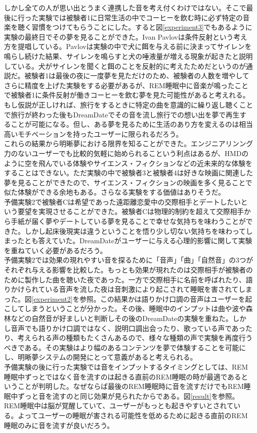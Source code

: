 しかし全ての人が思い出とうまく連携した音を考え付くわけではない。そこで最後に行った実験では被験者1に日常生活の中でコーヒーを飲む時に必ず特定の音楽を聴く習慣をつけてもらうことにした。すると図\ref{experiment3}でもあるように実験の最終日でその夢を見ることができた。Ivan Pavlovは条件反射という考え方を提唱している\cite{pavlov}。Pavlovは実験の中で犬に餌を与える前に決まってサイレンを鳴らし続けた結果、サイレンを鳴らすと犬の唾液量が増える現象が起きたと説明している。犬がサイレンを聞くと餌のことを反射的に考えたためだというのが通説だ。被験者1は最後の夜に一度夢を見ただけのため、被験者の人数を増やしてさらに精度を上げた実験をする必要があるが、REM睡眠中に音楽が鳴ったことで被験者1に条件反射が働きコーヒーを飲む夢を見た可能性があると考えれる。もし仮説が正しければ、旅行をするときに特定の曲を意識的に繰り返し聴くことで旅行が終わった後もDreamDateでその音を流し旅行での想い出を夢で再生することが可能になる。但し、ある夢を見るために生活のあり方を変えるのは相当高いモチベーションを持ったユーザーに限られるだろう。\\

これらの結果から明晰夢における限界を知ることができた。エンジニアリンング力のないユーザーでも比較的気軽に始められるこという利点はあるが、HMDのように空を飛んでいる体験やサイエンス・フィクションなどの近未来的な体験をすることはできない。ただ実験の中で被験者3と被験者4は好きな映画に関連した夢を見ることができたので、サイエンス・フィクションの映画を多く見ることで似た体験ができる余地もある。さらなる実験をする価値はありそうだ。\\

予備実験2で被験者Cは希望であった遠距離恋愛中の交際相手とデートしたいという要望を実現させることができた。被験者Cは物理的制約を超えて交際相手から手紙が届く夢やデートしている夢を見ることで幸せな気持ちを味わうことができた。しかし起床後現実は違うということを悟り少し切ない気持ちを味わってしまったとも答えていた。DreamDateがユーザーに与える心理的影響に関して実験を重ねていく必要があるだろう。\\

予備実験2では効果の現れやすい音を探るために「音声」「曲」「自然音」の3つがそれぞれ与える影響を比較した。もっとも効果が現れたのは交際相手が被験者のために製作した曲を聴いた夜であった。一方で交際相手に名前を呼ばれたり、語りかけられている音声を流した夜は音刺激により起こされて睡眠を害されてしまった。図\ref{experiment2}を参照。この結果かは語りかけ口調の音声はユーザーを起こしてしまうということが分かった。その後、睡眠中のインプットは曲や波や森林などの自然音が好ましいと判断しその後のDreamDateの実験を重ねた。しかし音声でも語りかけ口調ではなく、説明口調出会ったり、歌っている声であったり、考えられる声の種類もたくさんあるので、様々な種類の声で実験を再度行うべきである。その実験はより幅のあるコンテンツを夢で体験することを可能にし、明晰夢システムの開発にとって意義があると考えられる。\\

予備実験の後に行った実験では音をインプットするタイミングとしては、REM睡眠中ずっとではなく音を流すのは起きる直前のREM睡眠の時が最適であるということが判明した。なぜならば最後のREM睡眠時に音を流すだけでもREM睡眠中ずっと音を流すのと同じ効果が見られたからである。図\ref{result}を参照。REM睡眠中は脳が覚醒していて、ユーザーがもっとも起きやすいとされている\cite{remNonRem}。よってユーザーの睡眠が害される可能性を低めるために起きる直前のREM睡眠のみに音を流すが良いだろう。\\
